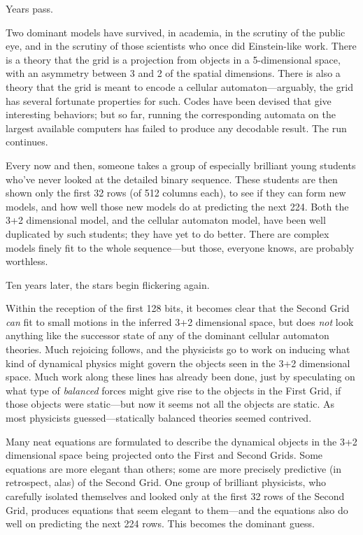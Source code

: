{
 Years pass.}

{
 Two dominant models have survived, in academia, in the scrutiny of
the public eye, and in the scrutiny of those scientists who once did
Einstein-like work. There is a theory that the grid is a projection
from objects in a 5-dimensional space, with an asymmetry between 3 and
2 of the spatial dimensions. There is also a theory that the grid is
meant to encode a cellular automaton---arguably, the grid has several
fortunate properties for such. Codes have been devised that give
interesting behaviors; but so far, running the corresponding automata
on the largest available computers has failed to produce any decodable
result. The run continues.}

{
 Every now and then, someone takes a group of especially brilliant
young students who've never looked at the detailed
binary sequence. These students are then shown only the first 32 rows
(of 512 columns each), to see if they can form new models, and how well
those new models do at predicting the next 224. Both the 3+2
dimensional model, and the cellular automaton model, have been well
duplicated by such students; they have yet to do better. There are
complex models finely fit to the whole sequence---but those, everyone
knows, are probably worthless.}

{
 Ten years later, the stars begin flickering again.}

{
 Within the reception of the first 128 bits, it becomes clear that
the Second Grid \textit{can} fit to small motions in the inferred 3+2
dimensional space, but does \textit{not} look anything like the
successor state of any of the dominant cellular automaton theories.
Much rejoicing follows, and the physicists go to work on inducing what
kind of dynamical physics might govern the objects seen in the 3+2
dimensional space. Much work along these lines has already been done,
just by speculating on what type of \textit{balanced} forces might give
rise to the objects in the First Grid, if those objects were
static---but now it seems not all the objects are static. As most
physicists guessed---statically balanced theories seemed contrived.}

{
 Many neat equations are formulated to describe the dynamical
objects in the 3+2 dimensional space being projected onto the First and
Second Grids. Some equations are more elegant than others; some are
more precisely predictive (in retrospect, alas) of the Second Grid. One
group of brilliant physicists, who carefully isolated themselves and
looked only at the first 32 rows of the Second Grid, produces equations
that seem elegant to them---and the equations also do well on
predicting the next 224 rows. This becomes the dominant guess.}

